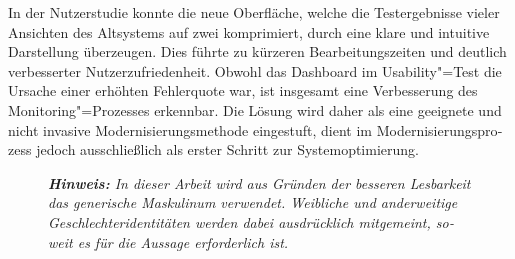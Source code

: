 \begin{otherlanguage}{ngerman}
    In der Nutzerstudie konnte die neue Oberfläche, welche die Testergebnisse vieler Ansichten des Altsystems auf zwei komprimiert, durch eine klare und intuitive Darstellung überzeugen. Dies führte zu kürzeren Bearbeitungszeiten und deutlich verbesserter Nutzerzufriedenheit. Obwohl das Dashboard im Usability"=Test die Ursache einer erhöhten Fehlerquote war, ist insgesamt eine Verbesserung des Monitoring"=Prozesses erkennbar. Die Lösung wird daher als eine geeignete und nicht invasive Modernisierungsmethode eingestuft, dient im Modernisierungsprozess jedoch ausschließlich als erster Schritt zur Systemoptimierung.
    

\begin{figure}[b]
    \noindent
    \textit{\textbf{Hinweis:} In dieser Arbeit wird aus Gründen der besseren Lesbarkeit das generische Maskulinum verwendet. Weibliche und anderweitige Geschlechteridentitäten werden dabei ausdrücklich mitgemeint, soweit es für die Aussage erforderlich ist.}
\end{figure}



\end{otherlanguage}
